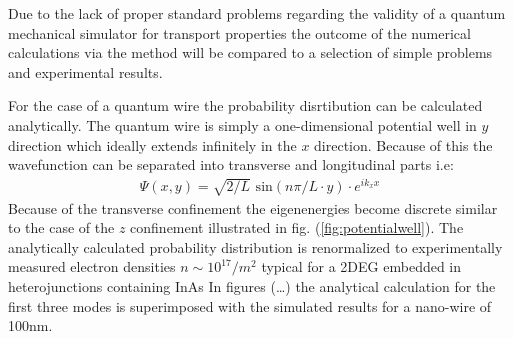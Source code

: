 Due to the lack of proper standard problems regarding the validity of a quantum mechanical simulator for transport properties the outcome of the numerical calculations via the \gfnc{} method will be compared to a selection of simple problems and experimental results.\par
For the case of a quantum wire the probability disrtibution can be calculated analytically. The quantum wire is simply a one-dimensional potential well in $y$ direction which ideally extends infinitely in the $x$ direction.
Because of this the wavefunction can be separated into transverse and longitudinal parts i.e:
\begin{align}
\Psi(x,y) = \sqrt{2/L}\text{ sin}(n\pi/L \cdot y) \cdot e^{ik_xx}
\end{align}
Because of the transverse confinement the eigenenergies become discrete similar to the case of the $z$ confinement illustrated in fig. (\ref{fig:potentialwell}).
The analytically calculated probability distribution is renormalized to experimentally measured electron densities $n \sim 10^{17}/m^2$ typical for a 2DEG embedded in heterojunctions containing InAs \cite{JJAP.26.L59}
In figures (\dots ) the analytical calculation for the first three modes is superimposed with the simulated results for a nano-wire of 100nm. 

